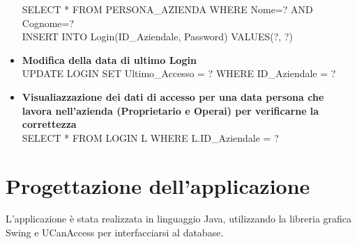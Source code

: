 \documentclass{article}
\begin{document}
\begin{itemize}
SELECT * FROM PERSONA\_AZIENDA WHERE Nome=? AND Cognome=? \\\newline
INSERT INTO Login(ID\_Aziendale, Password) VALUES(?, ?)\\\newline
\item \textbf{Modifica della data di ultimo Login}\\\newline
UPDATE LOGIN SET Ultimo\_Accesso = ? WHERE ID\_Aziendale = ? \\\newline
\item \textbf{Visualiazzazione dei dati di accesso per una data persona che lavora nell'azienda (Proprietario e Operai) per verificarne la correttezza }\\\newline
SELECT * FROM LOGIN L WHERE L.ID\_Aziendale = ?\\\newline
\end{itemize}
\newpage
\section{Progettazione dell'applicazione}
L'applicazione è stata realizzata in linguaggio Java, utilizzando la libreria grafica Swing e UCanAccess per interfacciarsi al database.\\\newline
\end{document}
